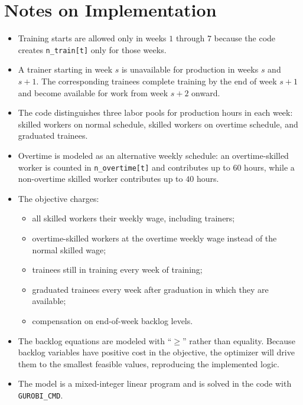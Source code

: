 \section*{Notes on Implementation}

\begin{itemize}
    \item Training starts are allowed only in weeks $1$ through $7$ because the code creates \texttt{n\_train[t]} only for those weeks.
    \item A trainer starting in week $s$ is unavailable for production in weeks $s$ and $s+1$. The corresponding trainees complete training by the end of week $s+1$ and become available for work from week $s+2$ onward.
    \item The code distinguishes three labor pools for production hours in each week: skilled workers on normal schedule, skilled workers on overtime schedule, and graduated trainees.
    \item Overtime is modeled as an alternative weekly schedule: an overtime-skilled worker is counted in \texttt{n\_overtime[t]} and contributes up to $60$ hours, while a non-overtime skilled worker contributes up to $40$ hours.
    \item The objective charges:
    \begin{itemize}
        \item all skilled workers their weekly wage, including trainers;
        \item overtime-skilled workers at the overtime weekly wage instead of the normal skilled wage;
        \item trainees still in training every week of training;
        \item graduated trainees every week after graduation in which they are available;
        \item compensation on end-of-week backlog levels.
    \end{itemize}
    \item The backlog equations are modeled with ``$\ge$'' rather than equality. Because backlog variables have positive cost in the objective, the optimizer will drive them to the smallest feasible values, reproducing the implemented logic.
    \item The model is a mixed-integer linear program and is solved in the code with \texttt{GUROBI\_CMD}.
\end{itemize}
